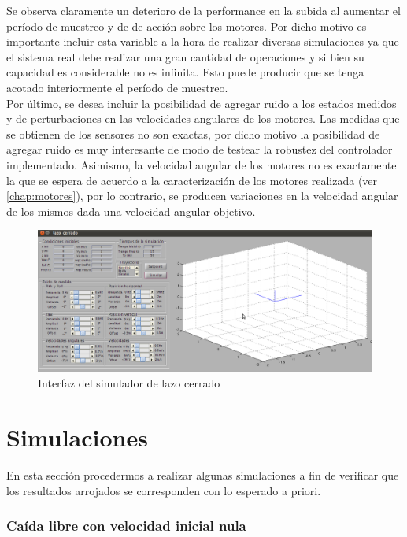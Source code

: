 \documentclass[main]{subfiles}
\begin{document}
Se observa claramente un deterioro de la performance en la subida al aumentar el per\'iodo de muestreo y de de acci\'on sobre los motores. Por dicho motivo es importante incluir esta variable a la hora de realizar diversas simulaciones ya que el sistema real debe realizar una gran cantidad de operaciones y si bien su capacidad es considerable no es infinita. Esto puede producir que se tenga acotado interiormente el per\'iodo de muestreo.\\

Por \'ultimo, se desea incluir la posibilidad de agregar ruido a los estados medidos y de perturbaciones en las velocidades angulares de los motores. Las medidas que se obtienen de los sensores no son exactas, por dicho motivo la posibilidad de agregar ruido es muy interesante de modo de testear la robustez del controlador implementado. Asimismo, la velocidad angular de los motores no es exactamente la que se espera de acuerdo a la caracterización de los motores realizada (ver \ref{chap:motores}), por lo contrario, se producen variaciones en la velocidad angular de los mismos dada una velocidad angular objetivo.  


  \begin{figure}[h!]
	\centering
	\includegraphics[width=1\textwidth]{./pics_simulador/vistac.png}
	\caption{Interfaz del simulador de lazo cerrado}
	\label{fig:vistac}
\end{figure}

\section{Simulaciones}
En esta secci\'on procedermos a realizar algunas simulaciones a fin de verificar que los resultados arrojados se corresponden con lo esperado a priori. 

\subsubsection{Ca\'ida libre con velocidad inicial nula}
\end{document}
